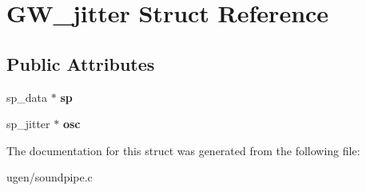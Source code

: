 \hypertarget{structGW__jitter}{}\section{G\+W\+\_\+jitter Struct Reference}
\label{structGW__jitter}
\subsection*{Public Attributes}
\begin{DoxyCompactItemize}
\item 
\hypertarget{structGW__jitter_abf39cee8a870348a300e7b87d1174dc0}{}\label{structGW__jitter_abf39cee8a870348a300e7b87d1174dc0} 
sp\+\_\+data $\ast$ {\bfseries sp}
\item 
\hypertarget{structGW__jitter_a6dace8fadfa6f034136b61b0628d4d98}{}\label{structGW__jitter_a6dace8fadfa6f034136b61b0628d4d98} 
sp\+\_\+jitter $\ast$ {\bfseries osc}
\end{DoxyCompactItemize}


The documentation for this struct was generated from the following file\+:\begin{DoxyCompactItemize}
\item 
ugen/soundpipe.\+c\end{DoxyCompactItemize}
